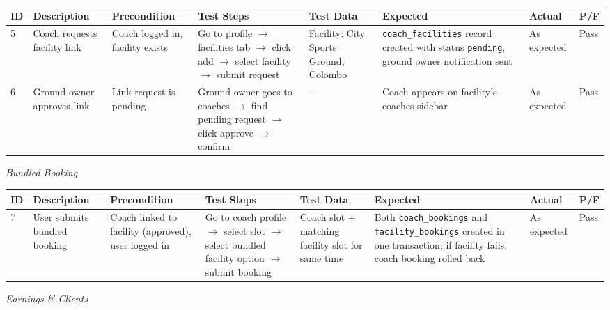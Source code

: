 \documentclass[12pt,a4paper]{report}
\begin{document}
\begin{center}
\footnotesize
\begin{longtable}{p{0.4cm} p{2.2cm} p{1.8cm} p{3.2cm} p{2.2cm} p{2.2cm} p{1.4cm} p{0.8cm}}
\toprule
\textbf{ID} & \textbf{Description} & \textbf{Precondition} & \textbf{Test Steps} & \textbf{Test Data} & \textbf{Expected} & \textbf{Actual} & \textbf{P/F}\\
\midrule
\endhead
5 & Coach requests facility link & Coach logged in, facility exists & Go to profile $\to$ facilities tab $\to$ click add $\to$ select facility $\to$ submit request & Facility: City Sports Ground, Colombo & \texttt{coach\_facilities} record created with status \texttt{pending}, ground owner notification sent & As expected & Pass\\[4pt]
6 & Ground owner approves link & Link request is pending & Ground owner goes to coaches $\to$ find pending request $\to$ click approve $\to$ confirm & -- & Coach appears on facility's coaches sidebar & As expected & Pass\\
\bottomrule
\end{longtable}
\end{center}

\textit{Bundled Booking}

\begin{center}
\footnotesize
\begin{longtable}{p{0.4cm} p{2.2cm} p{1.8cm} p{3.2cm} p{2.2cm} p{2.2cm} p{1.4cm} p{0.8cm}}
\toprule
\textbf{ID} & \textbf{Description} & \textbf{Precondition} & \textbf{Test Steps} & \textbf{Test Data} & \textbf{Expected} & \textbf{Actual} & \textbf{P/F}\\
\midrule
\endhead
7 & User submits bundled booking & Coach linked to facility (approved), user logged in & Go to coach profile $\to$ select slot $\to$ select bundled facility option $\to$ submit booking & Coach slot + matching facility slot for same time & Both \texttt{coach\_bookings} and \texttt{facility\_bookings} created in one transaction; if facility fails, coach booking rolled back & As expected & Pass\\
\bottomrule
\end{longtable}
\end{center}

\textit{Earnings \& Clients}
\end{document}
